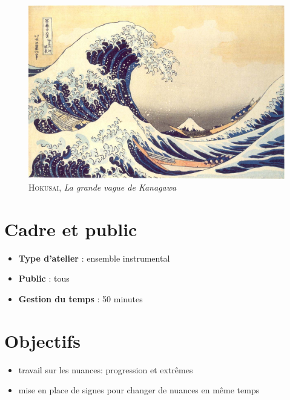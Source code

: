 \documentclass[a4paper,11pt,bibliography=totoc,numbers=noenddot,listof=flat,DIV=11,BCOR=0mm]{scrreprt}%
\begin{document}
\begin{figure}[ht!]
\begin{center}
\includegraphics[width=15cm]{hokusai.jpg}
\end{center}
\caption{{\textsc{Hokusai}, \emph{La grande vague de Kanagawa}}}
\end{figure}



\section*{Cadre et public}
\begin{itemize}
\item [\textbullet]\textbf{Type d'atelier} : ensemble instrumental

\item [\textbullet]\textbf{Public} : tous

\item [\textbullet]\textbf{Gestion du temps} : 50 minutes

\end{itemize}

\section*{Objectifs}
\begin{itemize}
\item travail sur les nuances: progression et extrêmes 
\item mise en place de signes pour changer de nuances en même temps
\end{itemize}
\end{document}
